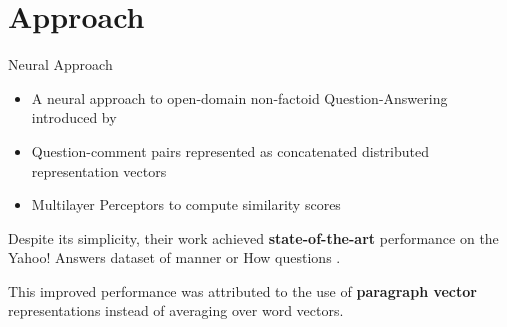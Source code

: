 \documentclass[10pt]{beamer}
\begin{document}
\section{Approach}

\begin{frame}{Neural Approach}
	\begin{itemize}
	\item A neural approach to open-domain non-factoid Question-Answering introduced by \cite{bogdanova2016we}
	\item Question-comment pairs represented as concatenated distributed representation vectors
	\item Multilayer Perceptors to compute similarity scores
	\end{itemize}

\justify
Despite its simplicity, their work achieved \textbf{state-of-the-art} performance on the Yahoo! Answers dataset of manner or How questions \cite{jansen2014discourse}.

This improved performance was attributed to the use of \textbf{paragraph vector} representations instead of averaging over word vectors.
\end{frame}
	
\end{document}
